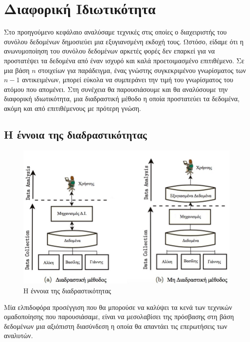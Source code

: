 \chapter{Διαφορική Ιδιωτικότητα}

Στο προηγούμενο κεφάλαιο αναλύσαμε τεχνικές στις οποίες ο διαχειριστής του συνόλου δεδομένων δημοσιεύει μια εξυγιανσμένη εκδοχή τους. Ωστόσο, είδαμε ότι η ανωνυμοποίηση του συνόλου δεδομένων αρκετές φορές δεν επαρκεί για να προστατέψει τα δεδομένα από έναν ισχυρό και καλά προετοιμασμένο επιτιθέμενο. Σε μια βάση $n$ στοιχείων για παράδειγμα, ένας γνώστης συγκεκριμένου γνωρίσματος των $n-1$ αντικειμένων, μπορεί εύκολα να συμπεράνει την τιμή του γνωρίσματος του ατόμου που απομένει. 
Στη συνέχεια θα παρουσιάσουμε και θα αναλύσουμε την διαφορική ιδιωτικότητα, μια διαδραστική μέθοδο η οποία προστατεύει τα δεδομένα, ακόμη και από επιτιθέμενους με πρότερη γνώση.


\section{Η έννοια της διαδραστικότητας}

\begin{figure} [ht]
\begin{center}
  \includegraphics[scale=0.4]{images/Int.jpg}
  \caption{Η έννοια της διαδραστικότητας}
  \end{center}
\end{figure}
Μία ελπιδοφόρα προσέγγιση που θα μπορούσε να καλύψει τα κενά των τεχνικών ομαδοποίησης που παρουσιάσαμε, είναι να μεσολαβίσει της πρόσβασης στη βάση δεδομένων μια αξιόπιστη διασύνδεση η οποία θα απαντάει τις επερωτήσεις των αναλυτών. 

